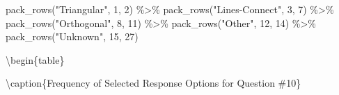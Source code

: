 \documentclass[
  letterpaper,
  DIV=11,
  numbers=noendperiod]{scrreprt}
\newenvironment{Shaded}{\begin{snugshade}}{\end{snugshade}}
\newcommand{\DecValTok}[1]{\textcolor[rgb]{0.68,0.00,0.00}{#1}}
\newcommand{\FunctionTok}[1]{\textcolor[rgb]{0.28,0.35,0.67}{#1}}
\newcommand{\NormalTok}[1]{\textcolor[rgb]{0.00,0.23,0.31}{#1}}
\newcommand{\SpecialCharTok}[1]{\textcolor[rgb]{0.37,0.37,0.37}{#1}}
\newcommand{\StringTok}[1]{\textcolor[rgb]{0.13,0.47,0.30}{#1}}
\begin{document}
\begin{Shaded}
\begin{Highlighting}[]
  \FunctionTok{pack\_rows}\NormalTok{(}\StringTok{"Triangular"}\NormalTok{, }\DecValTok{1}\NormalTok{, }\DecValTok{2}\NormalTok{) }\SpecialCharTok{\%\textgreater{}\%}
  \FunctionTok{pack\_rows}\NormalTok{(}\StringTok{"Lines{-}Connect"}\NormalTok{, }\DecValTok{3}\NormalTok{, }\DecValTok{7}\NormalTok{) }\SpecialCharTok{\%\textgreater{}\%}
  \FunctionTok{pack\_rows}\NormalTok{(}\StringTok{"Orthogonal"}\NormalTok{, }\DecValTok{8}\NormalTok{, }\DecValTok{11}\NormalTok{) }\SpecialCharTok{\%\textgreater{}\%}
  \FunctionTok{pack\_rows}\NormalTok{(}\StringTok{"Other"}\NormalTok{, }\DecValTok{12}\NormalTok{, }\DecValTok{14}\NormalTok{) }\SpecialCharTok{\%\textgreater{}\%}
  \FunctionTok{pack\_rows}\NormalTok{(}\StringTok{"Unknown"}\NormalTok{, }\DecValTok{15}\NormalTok{, }\DecValTok{27}\NormalTok{)}
\end{Highlighting}
\end{Shaded}

\textbackslash begin\{table\}

\textbackslash caption\{\label{tab:Q10-RESPONSES}Frequency of Selected
Response Options for Question \#10\} \centering
\end{document}
